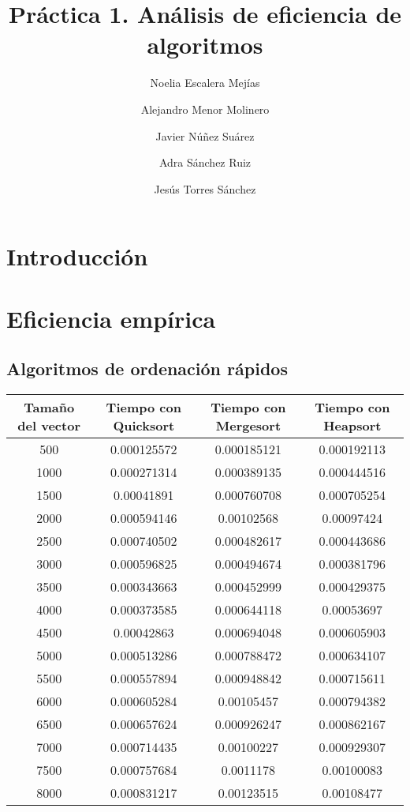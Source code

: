\documentclass{article}
\title{Práctica 1. Análisis de eficiencia de algoritmos}
\author{Noelia Escalera Mejías \\
		\and Alejandro Menor Molinero \\
		\and Javier Núñez Suárez \\
		\and Adra Sánchez Ruiz \\
		\and Jesús Torres Sánchez}
\begin{document}
	\maketitle
	\section{Introducción}
	\section{Eficiencia empírica}
	\subsection{Algoritmos de ordenación rápidos}
		\begin{longtable}{|c|c|c|c|}
			\hline
			Tamaño del vector & Tiempo con Quicksort & Tiempo con Mergesort & Tiempo con Heapsort \\ \hline
			500	     &  0.000125572	 &  0.000185121	 &  0.000192113  \\ \hline
			1000	 &  0.000271314	 &  0.000389135	 &  0.000444516  \\ \hline
			1500	 &  0.00041891	 &  0.000760708	 &  0.000705254  \\ \hline
			2000	 &  0.000594146	 &  0.00102568	 &  0.00097424  \\ \hline
			2500	 &  0.000740502	 &  0.000482617	 &  0.000443686  \\ \hline
			3000	 &  0.000596825	 &  0.000494674	 &  0.000381796  \\ \hline
			3500	 &  0.000343663	 &  0.000452999	 &  0.000429375  \\ \hline
			4000	 &  0.000373585	 &  0.000644118	 &  0.00053697  \\ \hline
			4500	 &  0.00042863	 &  0.000694048	 &  0.000605903  \\ \hline
			5000	 &  0.000513286	 &  0.000788472	 &  0.000634107  \\ \hline
			5500	 &  0.000557894	 &  0.000948842	 &  0.000715611  \\ \hline
			6000	 &  0.000605284	 &  0.00105457	 &  0.000794382  \\ \hline
			6500	 &  0.000657624	 &  0.000926247	 &  0.000862167  \\ \hline
			7000	 &  0.000714435	 &  0.00100227	 &  0.000929307  \\ \hline
			7500	 &  0.000757684	 &  0.0011178	 &  0.00100083  \\ \hline
			8000	 &  0.000831217	 &  0.00123515	 &  0.00108477  \\ \hline

\end{longtable}
\end{document}
